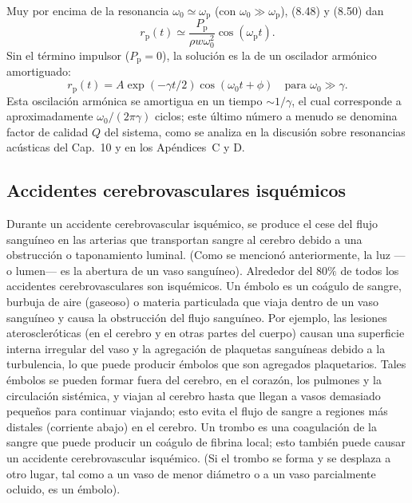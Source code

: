 \documentclass[12pt]{book}
\begin{document}
Muy por encima de la resonancia $\omega_0 \simeq \omega_{\text{p}}$ (con $\omega_0 \gg \omega_{\text{p}}$), (8.48) y (8.50) dan
\begin{equation}
r_{\text{p}}(t) \simeq \frac{P_{\text{p}}}{\rho w \omega_0^2} \cos(\omega_{\text{p}} t).
\label{eq:851}
\end{equation}
Sin el término impulsor ($P_{\text{p}} = 0$), la solución es la de un oscilador armónico amortiguado:
\begin{equation*}
r_{\text{p}}(t) = A \exp(-\gamma t/2) \cos(\omega_0 t + \phi) \quad \text{para } \omega_0 \gg \gamma.
\end{equation*}
Esta oscilación armónica se amortigua en un tiempo ${\sim}1/\gamma$, el cual corresponde a aproximadamente $\omega_0/(2\pi\gamma)$ ciclos; este último número a menudo se denomina factor de calidad $Q$ del sistema, como se analiza en la discusión sobre resonancias acústicas del Cap.~10 y en los Apéndices~C y D.

\subsection{Accidentes cerebrovasculares isquémicos}

Durante un accidente cerebrovascular isquémico, se produce el cese del flujo sanguíneo en las arterias que transportan sangre al cerebro debido a una obstrucción o taponamiento luminal. (Como se mencionó anteriormente, la luz ---o lumen--- es la abertura de un vaso sanguíneo). Alrededor del $80\%$ de todos los accidentes cerebrovasculares son isquémicos. Un émbolo es un coágulo de sangre, burbuja de aire (gaseoso) o materia particulada que viaja dentro de un vaso sanguíneo y causa la obstrucción del flujo sanguíneo. Por ejemplo, las lesiones ateroscleróticas (en el cerebro y en otras partes del cuerpo) causan una superficie interna irregular del vaso y la agregación de plaquetas sanguíneas debido a la turbulencia, lo que puede producir émbolos que son agregados plaquetarios. Tales émbolos se pueden formar fuera del cerebro, en el corazón, los pulmones y la circulación sistémica, y viajan al cerebro hasta que llegan a vasos demasiado pequeños para continuar viajando; esto evita el flujo de sangre a regiones más distales (corriente abajo) en el cerebro. Un trombo es una coagulación de la sangre que puede producir un coágulo de fibrina local; esto también puede causar un accidente cerebrovascular isquémico. (Si el trombo se forma y se desplaza a otro lugar, tal como a un vaso de menor diámetro o a un vaso parcialmente ocluido, es un émbolo).
\end{document}

